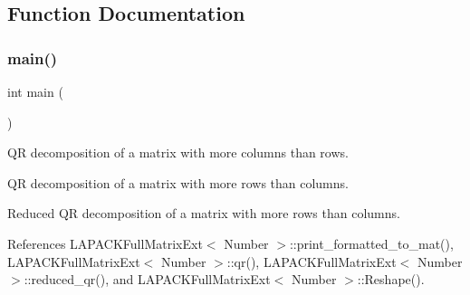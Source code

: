 \subsection{Function Documentation}
\mbox{\label{lapack-matrix-qr_8cc_ae66f6b31b5ad750f1fe042a706a4e3d4}} 
\subsubsection{\texorpdfstring{main()}{main()}}
{\footnotesize\ttfamily int main (\begin{DoxyParamCaption}{ }\end{DoxyParamCaption})}

QR decomposition of a matrix with more columns than rows.

QR decomposition of a matrix with more rows than columns.

Reduced QR decomposition of a matrix with more rows than columns.

References L\+A\+P\+A\+C\+K\+Full\+Matrix\+Ext$<$ Number $>$\+::print\+\_\+formatted\+\_\+to\+\_\+mat(), L\+A\+P\+A\+C\+K\+Full\+Matrix\+Ext$<$ Number $>$\+::qr(), L\+A\+P\+A\+C\+K\+Full\+Matrix\+Ext$<$ Number $>$\+::reduced\+\_\+qr(), and L\+A\+P\+A\+C\+K\+Full\+Matrix\+Ext$<$ Number $>$\+::\+Reshape().

